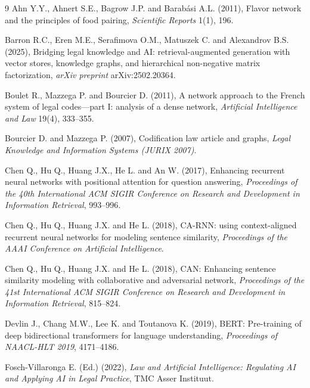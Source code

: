 \documentclass[twoside]{article}
\begin{document}
\begin{thebibliography}{9}
Ahn Y.Y., Ahnert S.E., Bagrow J.P. and Barab\'{a}si A.L. (2011), Flavor network and the principles of food pairing, {\it Scientific Reports} 1(1), 196.

Barron R.C., Eren M.E., Serafimova O.M., Matuszek C. and Alexandrov B.S. (2025), Bridging legal knowledge and AI: retrieval-augmented generation with vector stores, knowledge graphs, and hierarchical non-negative matrix factorization, {\it arXiv preprint} arXiv:2502.20364.

Boulet R., Mazzega P. and Bourcier D. (2011), A network approach to the French system of legal codes---part I: analysis of a dense network, {\it Artificial Intelligence and Law} 19(4), 333--355.

Bourcier D. and Mazzega P. (2007), Codification law article and graphs, {\it Legal Knowledge and Information Systems (JURIX 2007)}.

Chen Q., Hu Q., Huang J.X., He L. and An W. (2017), Enhancing recurrent neural networks with positional attention for question answering, {\it Proceedings of the 40th International ACM SIGIR Conference on Research and Development in Information Retrieval}, 993--996.

Chen Q., Hu Q., Huang J.X. and He L. (2018), CA-RNN: using context-aligned recurrent neural networks for modeling sentence similarity, {\it Proceedings of the AAAI Conference on Artificial Intelligence}.

Chen Q., Hu Q., Huang J.X. and He L. (2018), CAN: Enhancing sentence similarity modeling with collaborative and adversarial network, {\it Proceedings of the 41st International ACM SIGIR Conference on Research and Development in Information Retrieval}, 815--824.

Devlin J., Chang M.W., Lee K. and Toutanova K. (2019), BERT: Pre-training of deep bidirectional transformers for language understanding, {\it Proceedings of NAACL-HLT 2019}, 4171--4186.

Fosch-Villaronga E. (Ed.) (2022), {\it Law and Artificial Intelligence: Regulating AI and Applying AI in Legal Practice}, TMC Asser Instituut.


\end{thebibliography}
\end{document}
